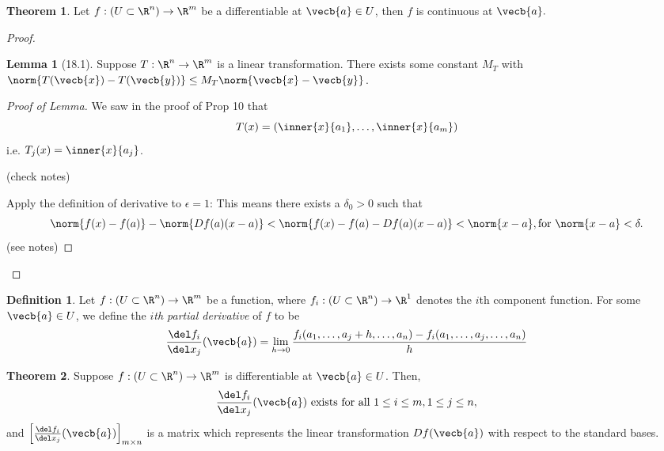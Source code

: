 \documentclass[a5paper]{article}
\theoremstyle{definition}%
\newtheorem{theorem}{Theorem}
\newtheorem*{lemma*}{Lemma}
\newtheorem*{definition*}{Definition}
\numberwithin{exercise}{section}
\theoremstyle{remark}%
\begin{document}
\begin{highlight}
\begin{theorem}
Let $f:(U\subset\R^n)\to\R^m$ be a differentiable at $\vecb{a}\in U$, then $f$ is continuous at $\vecb{a}. $
\end{theorem}
\end{highlight}
\begin{proof}\mbox{}
\begin{highlight}
\begin{lemma*}[18.1]
Suppose $T:\R^n\to \R^m$ is a linear transformation. There exists some constant $M_T$ with $\norm{T(\vecb{x})-T(\vecb{y})}\leq M_T\norm{\vecb{x}-\vecb{y}}$. 
\end{lemma*}
\end{highlight}
	\begin{proof}[Proof of Lemma]
	We saw in the proof of Prop 10 that 
	$$T(x)=(\inner{x}{a_1}, \ldots, \inner{x}{a_m})$$
	i.e. $T_j(x)=\inner{x}{a_j}$.
	
	(check notes)
	
	Apply the definition of derivative to $\epsilon=1$: This means there exists a $\delta_0>0$ such that 
	$$\norm{f(x)-f(a)}-\norm{Df(a)(x-a)}<\norm{f(x)-f(a)-Df(a)(x-a)}<\norm{x-a}, \text{for } \norm{x-a}<\delta.$$
	(see notes)
	
	
	\end{proof}
\end{proof}

\begin{highlight}
\begin{definition*}
Let $f:(U\subset\R^n)\to\R^m$ be a function, where $f_i:(U\subset\R^n)\to\R^1$ denotes the $i$th component function. For some $\vecb{a}\in U$, we define the \emph{$i$th partial derivative} of $f$ to be 
$$\frac{\del f_i}{\del x_j}(\vecb{a})=\lim_{h\to 0} \frac{f_i(a_1, \ldots, a_{j}+h, \ldots, a_n)-f_i(a_1, \ldots, a_j, \ldots, a_n)}{h}$$
\end{definition*}
\end{highlight}

\begin{highlight}
\begin{theorem}
Suppose  $f:(U\subset\R^n)\to\R^m$ is differentiable at $\vecb{a}\in U$. Then, 
$$\frac{\del f_i}{\del x_j}(\vecb{a}) \text{ exists for all } 1\leq i\leq m, 1\leq j\leq n,$$
and $\left[\frac{\del f_i}{\del x_j}(\vecb{a})\right]_{m\times n}$ is a matrix which represents the linear transformation $Df(\vecb{a})$ with respect to the standard bases. 
\end{theorem}
\end{highlight}
\end{document}
